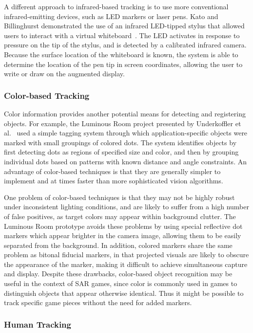 \documentclass{thesis}
\begin{document}
A different approach to infrared-based tracking is to use more conventional infrared-emitting devices, such as LED markers or laser pens. Kato and Billinghurst demonstrated the use of an infrared LED-tipped stylus that allowed users to interact with a virtual whiteboard~\cite{Kato1999}. The LED activates in response to pressure on the tip of the stylus, and is detected by a calibrated infrared camera. Because the surface location of the whiteboard is known, the system is able to determine the location of the pen tip in screen coordinates, allowing the user to write or draw on the augmented display.

\subsubsection{Color-based Tracking}

Color information provides another potential means for detecting and registering objects. For example, the Luminous Room project presented by Underkoffler et al.~\cite{Underkoffler1999} used a simple tagging system through which application-specific objects were marked with small groupings of colored dots. The system identifies objects by first detecting dots as regions of specified size and color, and then by grouping individual dots based on patterns with known distance and angle constraints. An advantage of color-based techniques is that they are generally simpler to implement and at times faster than more sophisticated vision algorithms. 

One problem of color-based techniques is that they may not be highly robust under inconsistent lighting conditions, and are likely to suffer from a high number of false positives, as target colors may appear within background clutter. The Luminous Room prototype avoids these problems by using special reflective dot markers which appear brighter in the camera image, allowing them to be easily separated from the background. In addition, colored markers share the same problem as bitonal fiducial markers, in that projected visuals are likely to obscure the appearance of the marker, making it difficult to achieve simultaneous capture and display. Despite these drawbacks, color-based object recognition may be useful in the context of SAR games, since color is commonly used in games to distinguish objects that appear otherwise identical. Thus it might be possible to track specific game pieces without the need for added markers.

\subsubsection{Human Tracking}
\end{document}
